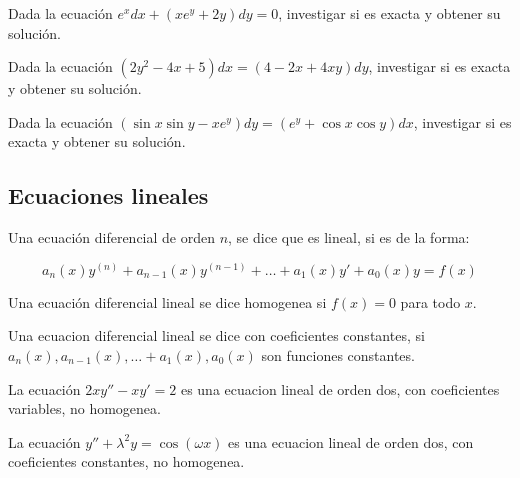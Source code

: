 		\begin{ejercicio}
			Dada la ecuación $e^x dx + (x e^y + 2y) dy = 0$, investigar si es exacta y obtener su solución.
		\end{ejercicio}

		\begin{ejercicio}
			Dada la ecuación $(2 y^2 - 4 x + 5) dx = (4 - 2 x + 4 x y) dy$, investigar si es exacta y obtener su solución.
		\end{ejercicio}

		\begin{ejercicio}
			Dada la ecuación $(\sin{x} \sin{y} - x e^y) dy = (e^y + \cos{x} \cos{y}) dx$, investigar si es exacta y obtener su solución.
		\end{ejercicio}

	\newpage
	\subsection{Ecuaciones lineales}

		\begin{definicion}
			Una ecuación diferencial de orden $n$, se dice que es lineal, si es de la forma:

			\begin{equation}
				a_n(x) y^{(n)} + a_{n-1}(x) y^{(n-1)} + \dots + a_1(x) y' + a_0(x) y = f(x)
			\end{equation}
		\end{definicion}

		\begin{definicion}
			Una ecuación diferencial lineal se dice homogenea si $f(x) = 0$ para todo $x$.
		\end{definicion}

		\begin{definicion}
			Una ecuacion diferencial lineal se dice con coeficientes constantes, si $a_n(x), a_{n-1}(x), \dots + a_1(x), a_0(x)$ son funciones constantes.
		\end{definicion}

		\begin{ejemplo}
			La ecuación $2x y'' - x y' = 2$ es una ecuacion lineal de orden dos, con coeficientes variables, no homogenea.
		\end{ejemplo}

		\begin{ejemplo}
			La ecuación $y'' + \lambda^2 y = \cos{(\omega x)}$ es una ecuacion lineal de orden dos, con coeficientes constantes, no homogenea.
		\end{ejemplo}

